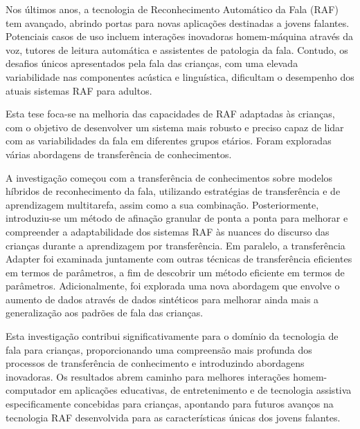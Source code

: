 \acresetall
\noindent Nos últimos anos, a tecnologia de Reconhecimento Automático da Fala (RAF) tem avançado, abrindo portas para novas aplicações destinadas a jovens falantes. Potenciais casos de uso incluem interações inovadoras homem-máquina através da voz, tutores de leitura automática e assistentes de patologia da fala. Contudo, os desafios únicos apresentados pela fala das crianças, com uma elevada variabilidade nas componentes acústica e linguística, dificultam o desempenho dos atuais sistemas RAF para adultos.

Esta tese foca-se na melhoria das capacidades de RAF adaptadas às crianças, com o objetivo de desenvolver um sistema mais robusto e preciso capaz de lidar com as variabilidades da fala em diferentes grupos etários. Foram exploradas várias abordagens de transferência de conhecimentos.

A investigação começou com a transferência de conhecimentos sobre modelos híbridos de reconhecimento da fala, utilizando estratégias de transferência e de aprendizagem multitarefa, assim como a sua combinação. Posteriormente, introduziu-se um método de afinação granular de ponta a ponta para melhorar e compreender a adaptabilidade dos sistemas RAF às nuances do discurso das crianças durante a aprendizagem por transferência. Em paralelo, a transferência Adapter foi examinada juntamente com outras técnicas de transferência eficientes em termos de parâmetros, a fim de descobrir um método eficiente em termos de parâmetros. Adicionalmente, foi explorada uma nova abordagem que envolve o aumento de dados através de dados sintéticos para melhorar ainda mais a generalização aos padrões de fala das crianças.

Esta investigação contribui significativamente para o domínio da tecnologia de fala para crianças, proporcionando uma compreensão mais profunda dos processos de transferência de conhecimento e introduzindo abordagens inovadoras. Os resultados abrem caminho para melhores interações homem-computador em aplicações educativas, de entretenimento e de tecnologia assistiva especificamente concebidas para crianças, apontando para futuros avanços na tecnologia RAF desenvolvida para as características únicas dos jovens falantes.

\newpage